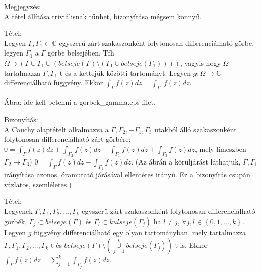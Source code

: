 \documentclass[12pt,a4paper]{scrartcl}
\newenvironment{tetel}{}{}
\newenvironment{bizonyitas}{}{}
\newenvironment{megjegyzes}{}{}
\begin{document}
\begin{megjegyzes}

Megjegyzés:\\
A tétel állítása triviálisnak tűnhet, bizonyítása mégsem könnyű.

\end{megjegyzes}

\begin{tetel}

Tétel:\\
Legyen \(\Gamma,\Gamma_{1} \subset {\mathbb{C}}\) egyszerű zárt
szakaszonként folytonosan differenciálható görbe, legyen \(\Gamma_{1}\)
a \(\Gamma\) görbe belsejében. Tfh
\(\Omega \supset \left( {\Gamma \cup \Gamma_{1} \cup \left( {{belseje}\left( \Gamma \right)\text{\textbackslash}\left( {\Gamma_{1} \cup {belseje}\left( \Gamma_{1} \right)} \right)} \right)} \right)\),
vagyis hogy \(\Omega\) tartalmazza \(\Gamma,\Gamma_{1}\)-t és a kettejük
közötti tartományt. Legyen
\(\left. g:\Omega\rightarrow{\mathbb{C}} \right.\) differenciálható
függvény. Ekkor
\({\int_{\Gamma}{f\left( z \right)dz}} = {\int_{\Gamma_{1}}{f\left( z \right)dz}}\).

\end{tetel}

Ábra: ide kell betenni a gorbek\_gamma.eps filet.

\begin{bizonyitas}

Bizonyítás:\\
A Cauchy alaptételt alkalmazva a
\(\Gamma,\Gamma_{2}, - \Gamma_{1},\Gamma_{3}\) utakból álló
szakaszonként folytonosan differenciálható zárt görbére:
\(0 = {\int_{\Gamma}{f\left( z \right)dz}} + {\int_{\Gamma_{2}}{f\left( z \right)dz}} - {\int_{\Gamma_{1}}{f\left( z \right)dz}} + {\int_{\Gamma_{3}}{f\left( z \right)dz}}\),
mely limeszben \(\left. \Gamma_{2}\rightarrow\Gamma_{3} \right.\))
\(0 = {\int_{\Gamma}{f\left( z \right)dz}} - {\int_{\Gamma_{1}}{f\left( z \right)dz}}\).
(Az ábrán a körüljárást láthatjuk, \(\Gamma,\Gamma_{1}\) irányítása
azonos, óramutató járásával ellentétes irányú. Ez a bizonyítás csupán
vázlatos, szemléletes.)

\end{bizonyitas}

\begin{tetel}

Tétel:\\
Legyenek \(\Gamma,\Gamma_{1},\Gamma_{2},...,\Gamma_{k}\) egyszerű zárt
szakaszonként folytonosan differenciálható görbék,
\(\Gamma_{j} \subset {belseje}\left( \Gamma \right)\) és
\(\Gamma_{l} \subset kulseje\left( \Gamma_{j} \right)\) ha \(l \neq j\),
\(\forall j,l \in \left\{ {0,1,...,k} \right\}\). Legyen \(g\) függvény
differenciálható egy olyan tartományban, mely tartalmazza
\(\Gamma,\Gamma_{1},\Gamma_{2},...,\Gamma_{k}\)-t és
\({belseje}\left( \Gamma \right)\text{\textbackslash}\left( {\underset{j = 1}{\overset{k}{\cup}}{{belseje}\left( \Gamma_{j} \right)}} \right)\)-t
is. Ekkor
\({\int_{\Gamma}{f\left( z \right)dz}} = {\sum\limits_{j = 1}^{k}{\int_{\Gamma_{j}}{f\left( z \right)dz}}}\).

\end{tetel}
\end{document}
